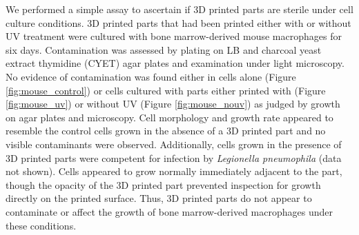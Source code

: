 \documentclass[fleqn,10pt]{wlpeerj}
\begin{document}
We performed a simple assay to ascertain if 3D printed parts are sterile under cell culture conditions. 3D printed parts that had been printed either with or without UV treatment were cultured with bone marrow-derived mouse macrophages for six days. Contamination was assessed by plating on LB and charcoal yeast extract thymidine (CYET) agar plates and examination under light microscopy. No evidence of contamination was found either in cells alone (Figure \ref{fig:mouse_control}) or cells cultured with parts either printed with (Figure \ref{fig:mouse_uv}) or without  UV (Figure \ref{fig:mouse_nouv}) as judged by growth on agar plates and microscopy. Cell morphology and growth rate appeared to resemble the control cells grown in the absence of a 3D printed part and no visible contaminants were observed. Additionally, cells grown in the presence of 3D printed parts were competent for infection by {\em Legionella pneumophila} (data not shown). Cells appeared to grow normally immediately adjacent to the part, though the opacity of the 3D printed part prevented inspection for growth directly on the printed surface. Thus, 3D printed parts do not appear to contaminate or affect the growth of bone marrow-derived macrophages under these conditions.
\end{document}
